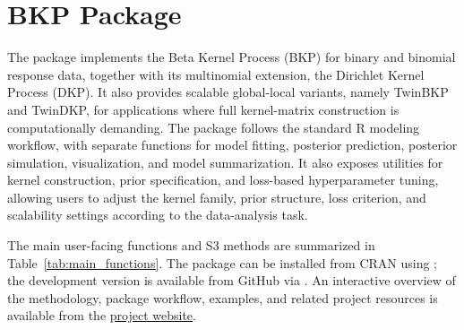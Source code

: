 \documentclass[article, shortnames]{jss}
\begin{document}
\section{BKP Package}\label{sec:package}

The  package \citep{Zhao2026BKP} implements the Beta Kernel Process (BKP) for binary and binomial response data, together with its multinomial extension, the Dirichlet Kernel Process (DKP). It also provides scalable global-local variants, namely TwinBKP and TwinDKP, for applications where full kernel-matrix construction is computationally demanding. The package follows the standard R modeling workflow, with separate functions for model fitting, posterior prediction, posterior simulation, visualization, and model summarization. It also exposes utilities for kernel construction, prior specification, and loss-based hyperparameter tuning, allowing users to adjust the kernel family, prior structure, loss criterion, and scalability settings according to the data-analysis task.

The main user-facing functions and S3 methods are summarized in Table~\ref{tab:main_functions}. The package can be installed from CRAN using ; the development version is available from GitHub via .
An interactive overview of the methodology, package workflow, examples, and related project resources is available from the \href{https://jiangyan-zhao.github.io/BKP-website/}{ project website}.
\end{document}
